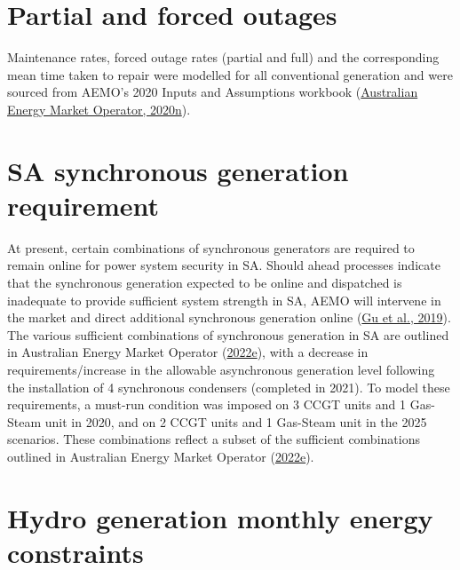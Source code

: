 \documentclass[12pt,a4paper,]{report}
\begin{document}
\hypertarget{partial-and-forced-outages}{%
\section{Partial and forced outages}\label{partial-and-forced-outages}}

Maintenance rates, forced outage rates (partial and full) and the
corresponding mean time taken to repair were modelled for all
conventional generation and were sourced from AEMO's 2020 Inputs and
Assumptions workbook
(\protect\hyperlink{ref-australianenergymarketoperator2020InputsAssumptions2020}{Australian
Energy Market Operator, 2020n}).

\hypertarget{sa-synchronous-generation-requirement}{%
\section{SA synchronous generation
requirement}\label{sa-synchronous-generation-requirement}}

At present, certain combinations of synchronous generators are required
to remain online for power system security in SA. Should ahead processes
indicate that the synchronous generation expected to be online and
dispatched is inadequate to provide sufficient system strength in SA,
AEMO will intervene in the market and direct additional synchronous
generation online (\protect\hyperlink{ref-guReviewSystemStrength2019}{Gu
et al., 2019}). The various sufficient combinations of synchronous
generation in SA are outlined in Australian Energy Market Operator
(\protect\hyperlink{ref-australianenergymarketoperatorTransferLimitAdvice2022}{2022e}),
with a decrease in requirements/increase in the allowable asynchronous
generation level following the installation of 4 synchronous condensers
(completed in 2021). To model these requirements, a must-run condition
was imposed on 3 CCGT units and 1 Gas-Steam unit in 2020, and on 2 CCGT
units and 1 Gas-Steam unit in the 2025 scenarios. These combinations
reflect a subset of the sufficient combinations outlined in Australian
Energy Market Operator
(\protect\hyperlink{ref-australianenergymarketoperatorTransferLimitAdvice2022}{2022e}).

\hypertarget{hydro-generation-monthly-energy-constraints}{%
\section{Hydro generation monthly energy
constraints}\label{hydro-generation-monthly-energy-constraints}}
\end{document}
